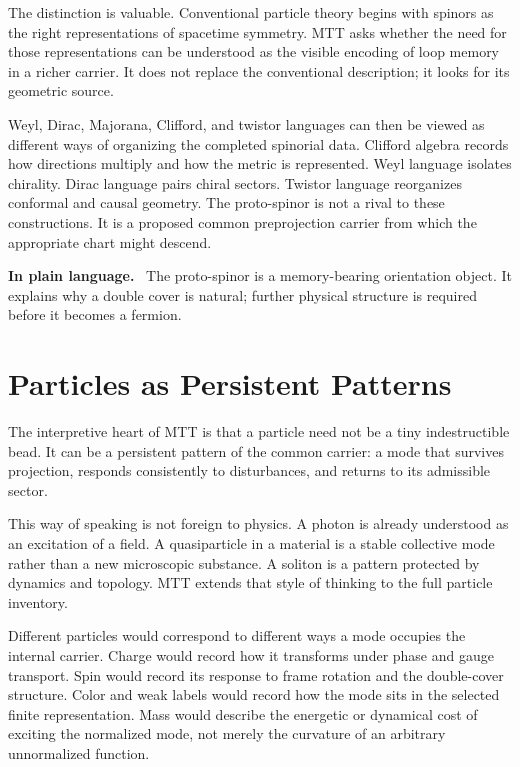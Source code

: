 \documentclass[11pt,openany]{book}
\newenvironment{plainsummary}
  {\par\small\noindent\textbf{In plain language.}\ }
  {\par}
\begin{document}
The distinction is valuable. Conventional particle theory begins with
spinors as the right representations of spacetime symmetry. MTT asks whether
the need for those representations can be understood as the visible encoding
of loop memory in a richer carrier. It does not replace the conventional
description; it looks for its geometric source.

Weyl, Dirac, Majorana, Clifford, and twistor languages can then be viewed as
different ways of organizing the completed spinorial data. Clifford algebra
records how directions multiply and how the metric is represented. Weyl
language isolates chirality. Dirac language pairs chiral sectors. Twistor
language reorganizes conformal and causal geometry. The proto-spinor is not a
rival to these constructions. It is a proposed common preprojection carrier
from which the appropriate chart might descend.

\begin{plainsummary}
The proto-spinor is a memory-bearing orientation object. It explains why a
double cover is natural; further physical structure is required before it
becomes a fermion.
\end{plainsummary}

\chapter{Particles as Persistent Patterns}

The interpretive heart of MTT is that a particle need not be a tiny
indestructible bead. It can be a persistent pattern of the common carrier: a
mode that survives projection, responds consistently to disturbances, and
returns to its admissible sector.

This way of speaking is not foreign to physics. A photon is already
understood as an excitation of a field. A quasiparticle in a material is a
stable collective mode rather than a new microscopic substance. A soliton is
a pattern protected by dynamics and topology. MTT extends that style of
thinking to the full particle inventory.

Different particles would correspond to different ways a mode occupies the
internal carrier. Charge would record how it transforms under phase and gauge
transport. Spin would record its response to frame rotation and the
double-cover structure. Color and weak labels would record how the mode sits
in the selected finite representation. Mass would describe the energetic or
dynamical cost of exciting the normalized mode, not merely the curvature of
an arbitrary unnormalized function.
\end{document}
